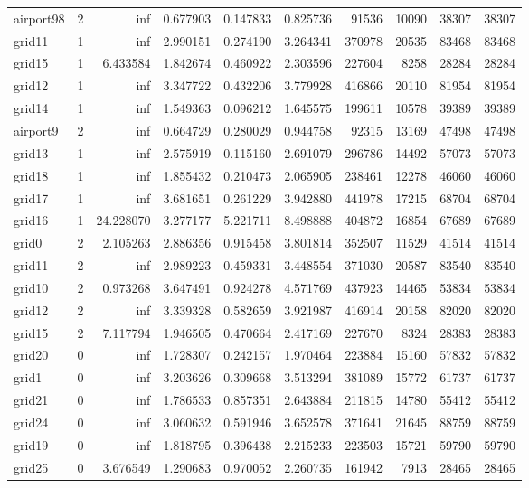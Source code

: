 \documentclass[../../../thesis.tex]{subfiles}
\begin{document}
\begin{longtable}{|l|r|r|r|r|r|r|r|r|r|}
airport98 & 2 & inf & 0.677903 & 0.147833 & 0.825736 & 91536 & 10090 & 38307 & 38307 \\
grid11 & 1 & inf & 2.990151 & 0.274190 & 3.264341 & 370978 & 20535 & 83468 & 83468 \\
grid15 & 1 & 6.433584 & 1.842674 & 0.460922 & 2.303596 & 227604 & 8258 & 28284 & 28284 \\
grid12 & 1 & inf & 3.347722 & 0.432206 & 3.779928 & 416866 & 20110 & 81954 & 81954 \\
grid14 & 1 & inf & 1.549363 & 0.096212 & 1.645575 & 199611 & 10578 & 39389 & 39389 \\
airport9 & 2 & inf & 0.664729 & 0.280029 & 0.944758 & 92315 & 13169 & 47498 & 47498 \\
grid13 & 1 & inf & 2.575919 & 0.115160 & 2.691079 & 296786 & 14492 & 57073 & 57073 \\
grid18 & 1 & inf & 1.855432 & 0.210473 & 2.065905 & 238461 & 12278 & 46060 & 46060 \\
grid17 & 1 & inf & 3.681651 & 0.261229 & 3.942880 & 441978 & 17215 & 68704 & 68704 \\
grid16 & 1 & 24.228070 & 3.277177 & 5.221711 & 8.498888 & 404872 & 16854 & 67689 & 67689 \\
grid0 & 2 & 2.105263 & 2.886356 & 0.915458 & 3.801814 & 352507 & 11529 & 41514 & 41514 \\
grid11 & 2 & inf & 2.989223 & 0.459331 & 3.448554 & 371030 & 20587 & 83540 & 83540 \\
grid10 & 2 & 0.973268 & 3.647491 & 0.924278 & 4.571769 & 437923 & 14465 & 53834 & 53834 \\
grid12 & 2 & inf & 3.339328 & 0.582659 & 3.921987 & 416914 & 20158 & 82020 & 82020 \\
grid15 & 2 & 7.117794 & 1.946505 & 0.470664 & 2.417169 & 227670 & 8324 & 28383 & 28383 \\
grid20 & 0 & inf & 1.728307 & 0.242157 & 1.970464 & 223884 & 15160 & 57832 & 57832 \\
grid1 & 0 & inf & 3.203626 & 0.309668 & 3.513294 & 381089 & 15772 & 61737 & 61737 \\
grid21 & 0 & inf & 1.786533 & 0.857351 & 2.643884 & 211815 & 14780 & 55412 & 55412 \\
grid24 & 0 & inf & 3.060632 & 0.591946 & 3.652578 & 371641 & 21645 & 88759 & 88759 \\
grid19 & 0 & inf & 1.818795 & 0.396438 & 2.215233 & 223503 & 15721 & 59790 & 59790 \\
grid25 & 0 & 3.676549 & 1.290683 & 0.970052 & 2.260735 & 161942 & 7913 & 28465 & 28465 \\

\end{longtable}
\end{document}
